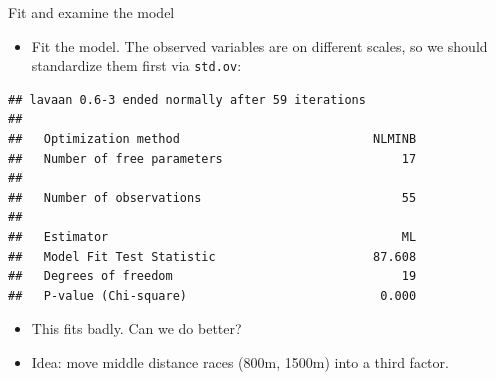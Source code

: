 \documentclass[ignorenonframetext,]{beamer}
\newenvironment{Shaded}{\begin{snugshade}}{\end{snugshade}}
\newcommand{\DataTypeTok}[1]{\textcolor[rgb]{0.13,0.29,0.53}{#1}}
\newcommand{\FloatTok}[1]{\textcolor[rgb]{0.00,0.00,0.81}{#1}}
\newcommand{\KeywordTok}[1]{\textcolor[rgb]{0.13,0.29,0.53}{\textbf{#1}}}
\newcommand{\NormalTok}[1]{#1}
\newcommand{\OperatorTok}[1]{\textcolor[rgb]{0.81,0.36,0.00}{\textbf{#1}}}
\newcommand{\StringTok}[1]{\textcolor[rgb]{0.31,0.60,0.02}{#1}}
\providecommand{\tightlist}{%
  \setlength{\itemsep}{0pt}\setlength{\parskip}{0pt}}
\begin{document}
\begin{frame}[fragile]{Fit and examine the model}
\protect\hypertarget{fit-and-examine-the-model}{}

\begin{itemize}
\tightlist
\item
  Fit the model. The observed variables are on different scales, so we
  should standardize them first via \texttt{std.ov}:
\end{itemize}

\scriptsize

\begin{Shaded}
\end{Shaded}

\begin{verbatim}
## lavaan 0.6-3 ended normally after 59 iterations
## 
##   Optimization method                           NLMINB
##   Number of free parameters                         17
## 
##   Number of observations                            55
## 
##   Estimator                                         ML
##   Model Fit Test Statistic                      87.608
##   Degrees of freedom                                19
##   P-value (Chi-square)                           0.000
\end{verbatim}

\normalsize

\begin{itemize}
\item
  This fits badly. Can we do better?
\item
  Idea: move middle distance races (800m, 1500m) into a third factor.
\end{itemize}

\end{frame}
\end{document}
